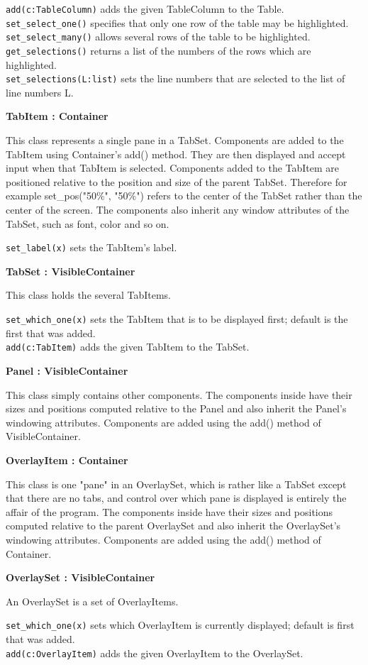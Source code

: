 \texttt{add(c:TableColumn)} adds the given TableColumn to the Table.\\
\texttt{set\_select\_one()} specifies that only one row of the table may be
highlighted.\\
\texttt{set\_select\_many()} allows several rows of the table to be
highlighted.\\
\texttt{get\_selections()} returns a list of the numbers of the rows which are
highlighted.\\
\texttt{set\_selections(L:list)} sets the line numbers that are selected to the
list of line numbers L.

{\ttfamily\bfseries
{}TabItem : Container}

This class represents a single pane in a TabSet. Components are added to
the TabItem using Container's add() method. They are
then displayed and accept input when that TabItem is selected.
Components added to the TabItem are positioned relative to the position
and size of the parent TabSet. Therefore for example
set\_pos("50\%",
"50\%") refers to the center of the TabSet
rather than the center of the screen. The components also inherit any
window attributes of the TabSet, such as font, color and so on.

\texttt{set\_label(x)} sets the TabItem's label.

{\ttfamily\bfseries
{}TabSet : VisibleContainer}

This class holds the several TabItems.

\texttt{set\_which\_one(x)} sets the TabItem that is to be displayed first;
default is the first that was added.\\
\texttt{add(c:TabItem)} adds the given TabItem to the TabSet.

{\ttfamily\bfseries
{}Panel : VisibleContainer}

This class simply contains other components. The components inside have
their sizes and positions computed relative to the Panel and also
inherit the Panel's windowing attributes. Components
are added using the add() method of VisibleContainer.

{\ttfamily\bfseries
{}OverlayItem : Container}

This class is one "pane" in an OverlaySet,
which is rather like a TabSet except that there are no tabs, and
control over which pane is displayed is entirely the affair of the
program. The components inside have their sizes and positions computed
relative to the parent OverlaySet and also inherit the
OverlaySet's windowing attributes. Components are
added using the add() method of Container.

{\ttfamily\bfseries
{}OverlaySet : VisibleContainer}

An OverlaySet is a set of OverlayItems.

\texttt{set\_which\_one(x)} sets which OverlayItem is currently displayed;
default is first that was added.\\
\texttt{add(c:OverlayItem)} adds the given OverlayItem to the OverlaySet.
